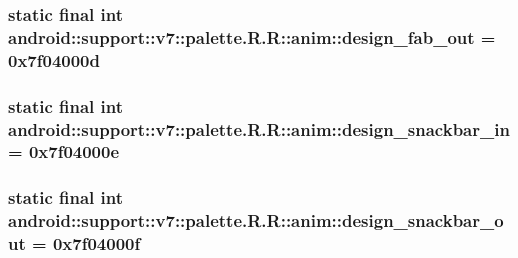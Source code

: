 \hypertarget{classandroid_1_1support_1_1v7_1_1palette_1_1_r_1_1anim_fa1feed5e05c0a4b9255cafec3f1909b}{
\subsubsection[{design\_\-fab\_\-out}]{\setlength{\rightskip}{0pt plus 5cm}static final int android::support::v7::palette.R.R::anim::design\_\-fab\_\-out = 0x7f04000d}}
\label{classandroid_1_1support_1_1v7_1_1palette_1_1_r_1_1anim_fa1feed5e05c0a4b9255cafec3f1909b}


\hypertarget{classandroid_1_1support_1_1v7_1_1palette_1_1_r_1_1anim_0d5c5a3594a5a4127ba6ccc2437d5829}{
\subsubsection[{design\_\-snackbar\_\-in}]{\setlength{\rightskip}{0pt plus 5cm}static final int android::support::v7::palette.R.R::anim::design\_\-snackbar\_\-in = 0x7f04000e}}
\label{classandroid_1_1support_1_1v7_1_1palette_1_1_r_1_1anim_0d5c5a3594a5a4127ba6ccc2437d5829}


\hypertarget{classandroid_1_1support_1_1v7_1_1palette_1_1_r_1_1anim_ac2616ccd82a1eb6a7b263edd90ba96c}{
\subsubsection[{design\_\-snackbar\_\-out}]{\setlength{\rightskip}{0pt plus 5cm}static final int android::support::v7::palette.R.R::anim::design\_\-snackbar\_\-out = 0x7f04000f}}
\label{classandroid_1_1support_1_1v7_1_1palette_1_1_r_1_1anim_ac2616ccd82a1eb6a7b263edd90ba96c}




